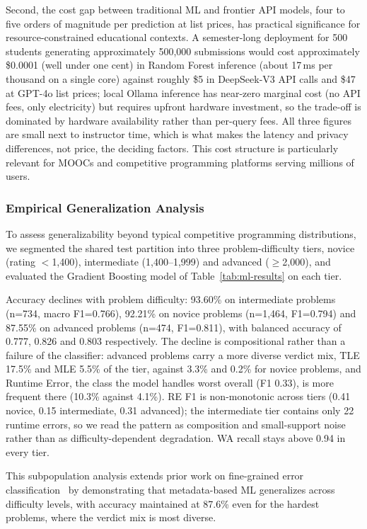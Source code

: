 \documentclass[acmsmall]{acmart}
\begin{document}
Second, the cost gap between traditional ML and frontier API models, four to
five orders of magnitude per prediction at list prices, has practical
significance for resource-constrained educational contexts. A semester-long
deployment for 500 students generating approximately 500,000 submissions would
cost approximately \$0.0001 (well under one cent) in Random Forest inference (about 17\,ms per thousand on a
single core) against roughly \$5 in DeepSeek-V3 API calls and \$47 at GPT-4o
list prices; local Ollama inference has near-zero marginal cost (no API
fees, only electricity) but requires upfront hardware investment, so the
trade-off is dominated by hardware availability rather than per-query fees.
All three figures are small next to instructor time, which is what makes the
latency and privacy differences, not price, the deciding factors. This cost
structure is particularly relevant for MOOCs and competitive programming
platforms serving millions of users.

\subsubsection{Empirical Generalization Analysis}\label{sec:skill-tier}
To assess generalizability beyond typical competitive programming
distributions, we segmented the shared test partition into three
problem-difficulty tiers, novice (rating $<$1,400), intermediate
(1,400--1,999) and advanced ($\geq$2,000), and evaluated the Gradient
Boosting model of Table~\ref{tab:ml-results} on each tier.

Accuracy declines with problem difficulty: 93.60\% on intermediate problems
(n=734, macro F1=0.766), 92.21\% on novice problems (n=1,464, F1=0.794) and
87.55\% on advanced problems (n=474, F1=0.811), with balanced accuracy of
0.777, 0.826 and 0.803 respectively. The decline is compositional rather than
a failure of the classifier: advanced problems carry a more diverse verdict
mix, TLE 17.5\% and MLE 5.5\% of the tier, against 3.3\% and 0.2\% for novice
problems, and Runtime Error, the class the model handles worst overall
(F1 0.33), is more frequent there (10.3\% against 4.1\%). RE F1 is
non-monotonic across tiers (0.41 novice, 0.15 intermediate, 0.31 advanced);
the intermediate tier contains only 22 runtime errors, so we read the pattern
as composition and small-support noise rather than as difficulty-dependent
degradation. WA recall stays above 0.94 in every tier.

This subpopulation analysis extends prior work on fine-grained error
classification~\cite{altadmri2015most} by demonstrating that metadata-based ML
generalizes across difficulty levels, with accuracy maintained at 87.6\% even
for the hardest problems, where the verdict mix is most diverse.
\end{document}
